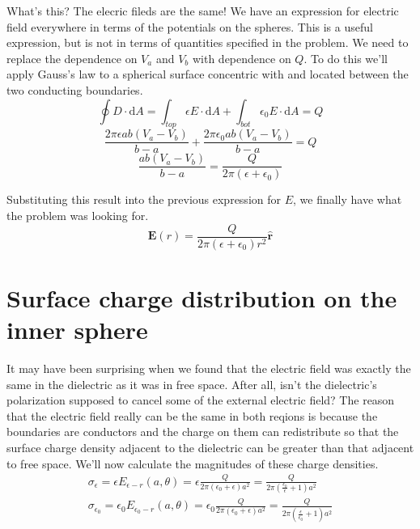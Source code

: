 \documentclass[10pt,a4paper]{article}
\begin{document}
What's this?  The elecric fileds are the same!  We have an expression for electric field everywhere in terms of the potentials on the spheres.  This is a useful expression, but is not in terms of quantities specified in the problem.  We need to replace the dependence on $V_a$ and $V_b$ with dependence on $Q$.  To do this we'll apply Gauss's law to a spherical surface concentric with and located between the two conducting boundaries.
\begin{equation}
\oint D\cdot \mathrm{d}A = \int _{top}\epsilon E \cdot \mathrm{d}A + \int _{bot}\epsilon _0 E\cdot \mathrm{d}A= Q
\end{equation}
\begin{equation}
\frac{2\pi\epsilon ab(V_a-V_b)}{b-a} + \frac{2\pi\epsilon_0 ab(V_a-V_b)}{b-a} =Q
\end{equation}
\begin{equation}
\frac{ab(V_a-V_b)}{b-a}=\frac{Q}{2\pi(\epsilon + \epsilon _0)}
\end{equation}

Substituting this result into the previous expression for $E$, we finally have what the problem was looking for.
\begin{equation}\boxed{
\mathbf{E}(r)=\frac{Q}{2\pi(\epsilon+\epsilon_0)r^2}\mathbf{\hat{r}}
}\end{equation}

\section{Surface charge distribution on the inner sphere}
It may have been surprising when we found that the electric field was exactly the same in the dielectric as it was in free space.  After all, isn't the dielectric's polarization supposed to cancel some of the external electric field?  The reason that the electric field really can be the same in both reqions is because the boundaries are conductors and the charge on them can redistribute so that the surface charge density adjacent to the dielectric can be greater than that adjacent to free space.  We'll now calculate the magnitudes of these charge densities.
\begin{align}
\sigma_\epsilon = \epsilon E_{\epsilon-r} (a, \theta) = \epsilon\frac{Q}{2\pi(\epsilon_0+\epsilon)a^2}=\frac{Q}{2\pi(\frac{\epsilon_0}{\epsilon}+1)a^2} \\
\sigma_{\epsilon_0} = \epsilon_0 E_{\epsilon_0-r} (a, \theta) = \epsilon_0\frac{Q}{2\pi(\epsilon_0+\epsilon)a^2}=\frac{Q}{2\pi(\frac{\epsilon}{\epsilon_0}+1)a^2}
\end{align}
\end{document}
